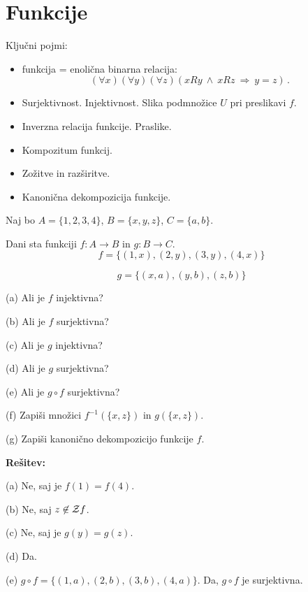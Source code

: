 \documentclass[11pt,paper=b5,footinclude,headinclude]{scrbook} %
\def\inn {{~\wedge~}}
\def\sledi {{~\Rightarrow~}}
\newtheorem{ex}{Vaja\hypertarget{sol:\theex}}[chapter]
\begin{document}
\section{Funkcije}

Ključni pojmi:
\begin{itemize}
  \item funkcija = enolična binarna relacija:
  $$(\forall x)(\forall y)(\forall z)(xRy\inn xRz\sledi y = z)\,.$$
  \item Surjektivnost. Injektivnost. Slika podmnožice $U$ pri preslikavi $f$.
  \item Inverzna relacija funkcije. Praslike.
  \item Kompozitum funkcij.
  \item Zožitve in razširitve.
  \item Kanonična dekompozicija funkcije.
\end{itemize}

\begin{ex}
Naj bo $A = \{1,2,3,4\}$, $B = \{x,y,z\}$, $C = \{a,b\}$.

Dani sta funkciji $f:A\to B$ in $g:B\to C$.
$$f = \{(1,x),(2,y),(3,y),(4,x)\}$$

$$g = \{(x,a),(y,b),(z,b)\}$$

(a) Ali je $f$ injektivna?

(b) Ali je $f$ surjektivna?

(c) Ali je $g$ injektivna?

(d) Ali je $g$ surjektivna?

(e) Ali je $g\circ f$ surjektivna?

(f) Zapiši množici $f^{-1}(\{x,z\})$ in $g(\{x,z\})$.

(g) Zapiši kanonično dekompozicijo funkcije $f$.
\end{ex}

\textbf{Rešitev:}

(a) Ne, saj je $f(1) = f(4)$.

(b) Ne, saj $z\not\in{\cal Z} f$.

(c) Ne, saj je $g(y) = g(z)$.

(d) Da.

(e) $g\circ f = \{(1,a), (2,b), (3,b), (4,a)\}$. Da, $g\circ f$ je surjektivna.
\end{document}

